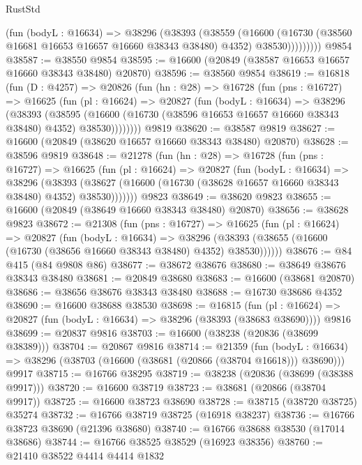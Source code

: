 \begin{lexlean}{RustStd}
\begin{coremodule}
              (fun (bodyL : @16634) =>
              @38296
                (@38393
                  (@38559
                    (@16600
                      (@16730 (@38560 @16681 @16653 @16657 @16660 @38343 @38480) @4352)
                      @38530)))))))))
    @9854
@38587 := @38550 @9854
@38595 := @16600 (@20849 (@38587 @16653 @16657 @16660 @38343 @38480) @20870)
@38596 := @38560 @9854
@38619 := @16818
    (fun (D : @4257) =>
    @20826
      (fun (hn : @28) =>
      @16728
        (fun (pns : @16727) =>
        @16625
          (fun (pl : @16624) =>
          @20827
            (fun (bodyL : @16634) =>
            @38296
              (@38393
                (@38595
                  (@16600 (@16730 (@38596 @16653 @16657 @16660 @38343 @38480) @4352) @38530))))))))
    @9819
@38620 := @38587 @9819
@38627 := @16600 (@20849 (@38620 @16657 @16660 @38343 @38480) @20870)
@38628 := @38596 @9819
@38648 := @21278
    (fun (hn : @28) =>
    @16728
      (fun (pns : @16727) =>
      @16625
        (fun (pl : @16624) =>
        @20827
          (fun (bodyL : @16634) =>
          @38296
            (@38393
              (@38627 (@16600 (@16730 (@38628 @16657 @16660 @38343 @38480) @4352) @38530)))))))
    @9823
@38649 := @38620 @9823
@38655 := @16600 (@20849 (@38649 @16660 @38343 @38480) @20870)
@38656 := @38628 @9823
@38672 := @21308
    (fun (pns : @16727) =>
    @16625
      (fun (pl : @16624) =>
      @20827
        (fun (bodyL : @16634) =>
        @38296 (@38393 (@38655 (@16600 (@16730 (@38656 @16660 @38343 @38480) @4352) @38530))))))
@38676 := @84 @415 (@84 @9808 @86)
@38677 := @38672 @38676
@38680 := @38649 @38676 @38343 @38480
@38681 := @20849 @38680
@38683 := @16600 (@38681 @20870)
@38686 := @38656 @38676 @38343 @38480
@38688 := @16730 @38686 @4352
@38690 := @16600 @38688 @38530
@38698 := @16815
    (fun (pl : @16624) => @20827 (fun (bodyL : @16634) => @38296 (@38393 (@38683 @38690))))
    @9816
@38699 := @20837 @9816
@38703 := @16600 (@38238 (@20836 (@38699 @38389)))
@38704 := @20867 @9816
@38714 := @21359
    (fun (bodyL : @16634) => @38296 (@38703 (@16600 (@38681 (@20866 (@38704 @16618))) @38690)))
    @9917
@38715 := @16766 @38295
@38719 := @38238 (@20836 (@38699 (@38388 @9917)))
@38720 := @16600 @38719
@38723 := @38681 (@20866 (@38704 @9917))
@38725 := @16600 @38723 @38690
@38728 := @38715 (@38720 @38725) @35274
@38732 := @16766 @38719 @38725 (@16918 @38237)
@38736 := @16766 @38723 @38690 (@21396 @38680)
@38740 := @16766 @38688 @38530 (@17014 @38686)
@38744 := @16766 @38525 @38529 (@16923 @38356)
@38760 := @21410
    @38522
    @4414
    @4414
    @1832

\end{coremodule}
\end{lexlean}
